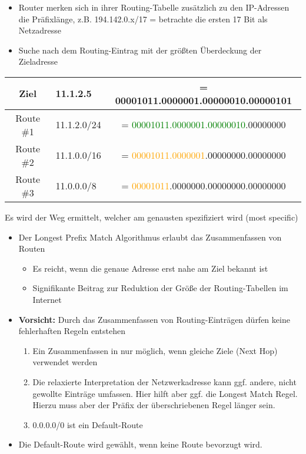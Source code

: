 \begin{itemize}
    \item Router merken sich in ihrer Routing-Tabelle zusätzlich zu den IP-Adressen die Präfixlänge, z.B. 194.142.0.x/17 = betrachte die ersten 17 Bit als Netzadresse
\end{itemize}

\begin{itemize}
    \item Suche nach dem Routing-Eintrag mit der größten Überdeckung der Zieladresse
\end{itemize}
\begin{center}
    \begin{tabular}{c l c}
        Ziel & 11.1.2.5 & = 00001011.0000001.00000010.00000101 \tabularnewline
        \hline
        Route \#1 & 11.1.2.0/24 & = \textcolor{green}{00001011.0000001.00000010}.00000000 \tabularnewline
        Route \#2 & 11.1.0.0/16 & = \textcolor{orange}{00001011.0000001}.00000000.00000000 \tabularnewline
        Route \#3 & 11.0.0.0/8  & = \textcolor{orange}{00001011}.0000000.00000000.00000000 \tabularnewline
    \end{tabular}
\end{center}
Es wird der Weg ermittelt, welcher am genausten spezifiziert wird (most specific)

\begin{itemize}
    \item Der Longest Prefix Match Algorithmus erlaubt das Zusammenfassen von Routen
    \begin{itemize}
        \item Es reicht, wenn die genaue Adresse erst nahe am Ziel bekannt ist
        \item Signifikante Beitrag zur Reduktion der Größe der Routing-Tabellen im Internet
    \end{itemize}
    \item \textbf{Vorsicht:} Durch das Zusammenfassen von Routing-Einträgen dürfen keine fehlerhaften Regeln entstehen
    \begin{enumerate}
        \item Ein Zusammenfassen in nur möglich, wenn gleiche Ziele (Next Hop) verwendet werden
        \item Die relaxierte Interpretation der Netzwerkadresse kann ggf. andere, nicht gewollte Einträge umfassen. Hier hilft aber ggf. die Longest Match Regel. Hierzu muss aber der Präfix der überschriebenen Regel länger sein.
        \item 0.0.0.0/0 ist ein Default-Route
    \end{enumerate}
\end{itemize}

\begin{itemize}
    \item Die Default-Route wird gewählt, wenn keine Route bevorzugt wird.
\end{itemize}
    